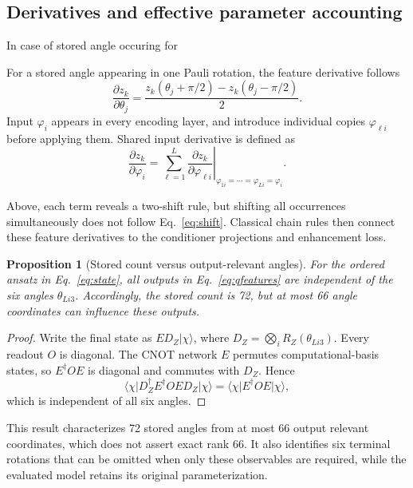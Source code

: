 \documentclass[10pt,a4paper]{article}
\newtheorem{proposition}{Proposition}
\newcommand{\ket}[1]{\lvert #1\rangle}
\newcommand{\bra}[1]{\langle #1\rvert}
\begin{document}
\subsection{Derivatives and effective parameter accounting}
In case of stored angle occuring for 

For a stored angle appearing in one Pauli rotation, the feature derivative follows \cite{gradients}
\begin{equation}\label{eq:shift}
\frac{\partial z_k}{\partial\theta_j}
=\frac{z_k(\theta_j+\pi/2)-z_k(\theta_j-\pi/2)}2.
\end{equation}
Input $\varphi_i$ appears in every encoding layer, and introduce individual copies $\varphi_{\ell i}$ before applying them. Shared input derivative is defined as 
\begin{equation}\label{eq:input_derivative}
\frac{\partial z_k}{\partial\varphi_i}
=\left.\sum_{\ell=1}^{L}\frac{\partial z_k}{\partial\varphi_{\ell i}}\right|_{\varphi_{1i}=\cdots=\varphi_{Li}=\varphi_i}.
\end{equation}

Above, each term reveals a two-shift rule, but shifting all occurrences simultaneously does not follow Eq.~\eqref{eq:shift}. Classical chain rules then connect these feature derivatives to the conditioner projections and enhancement loss.

\begin{proposition}[Stored count versus output-relevant angles]\label{prop:redundancy}
For the ordered ansatz in Eq.~\eqref{eq:state}, all outputs in Eq.~\eqref{eq:qfeatures} are independent of the six angles $\theta_{Li3}$. Accordingly, the stored count is 72, but at most 66 angle coordinates can influence these outputs.
\end{proposition}
\begin{proof}
Write the final state as $ED_Z\ket\chi$, where $D_Z=\bigotimes_iR_Z(\theta_{Li3})$. Every readout $O$ is diagonal. The CNOT network $E$ permutes computational-basis states, so $E^\dagger O E$ is diagonal and commutes with $D_Z$. Hence
\begin{equation}
\bra\chi D_Z^\dagger E^\dagger O E D_Z\ket\chi
=\bra\chi E^\dagger O E\ket\chi,
\end{equation}
which is independent of all six angles.
\end{proof}
This result characterizes 72 stored angles from at most 66 output relevant coordinates, which does not assert exact rank 66. It also identifies six terminal rotations that can be omitted when only these observables are required, while the evaluated model retains its original parameterization.
\end{document}
